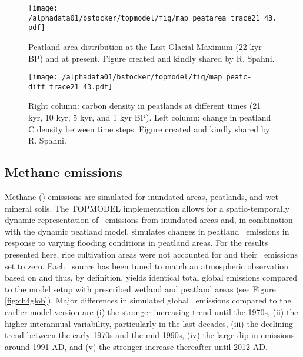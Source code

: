 \begin{figure}
\begin{center}
  \texttt{[image: /alphadata01/bstocker/topmodel/fig/map\_peatarea\_trace21\_43.pdf]}
\end{center}
\caption{Peatland area distribution at the Last Glacial Maximum (22 kyr BP) and at present. Figure created and kindly shared by R. Spahni.}
\label{fig:fpeat_LGM_pres}
\end{figure}

\begin{figure}
\begin{center}
  \texttt{[image: /alphadata01/bstocker/topmodel/fig/map\_peatc-diff\_trace21\_43.pdf]}
\end{center}
\caption{Right column: carbon density in peatlands at different times (21 kyr, 10 kyr, 5 kyr, and 1 kyr BP). Left column: change in peatland C density between time steps. Figure created and kindly shared by R. Spahni. }
\label{fig:Cpeat_LGM_pres}
\end{figure}


\clearpage

\subsection{Methane emissions}
Methane (\chh ) emissions are simulated for inundated areas, peatlands, and wet mineral soils. The TOPMODEL implementation allows for a spatio-temporally dynamic representation of \chh\ emissions from inundated areas and, in combination with the dynamic peatland model, simulates changes in peatland \chh\ emissions in response to varying flooding conditions in peatland areas. For the results presented here, rice cultivation areas were not accounted for and their \chh\ emissions set to zero. Each \chh\ source has been tuned to match an atmospheric observation based on \citet{spahni11bg} and thus, by definition, yields identical total global emissions compared to the model setup with prescribed wetland and peatland areas (see Figure \ref{fig:ch4glob}). Major differences in simulated global \chh\ emissions compared to the earlier model version are (i) the stronger increasing trend until the 1970s, (ii) the higher interannual variability, particularly in the last decades, (iii) the declining trend between the early 1970s and the mid 1990s, (iv) the large dip in emissions around 1991 AD, and (v) the stronger increase thereafter until 2012 AD.

